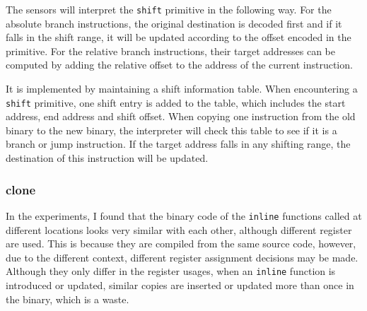 The sensors will interpret the {\tt shift} primitive in the following way. 
For the absolute branch instructions, the original destination is decoded
first and if it falls in the shift range, it will be updated according
to the offset encoded in the primitive.
For the relative branch instructions, their target addresses can be computed by adding the relative offset to the 
address of the current instruction.

It is implemented by maintaining a shift information table. When encountering a {\tt shift} primitive,
one shift entry is added to the table, which includes the start address, end address and shift offset.
When copying one instruction from the old binary to the new binary, the interpreter will check this table to see if it 
is a branch or jump instruction. If the target address falls in any shifting range, the destination of this instruction 
will be updated.
%        

\subsubsection {clone}
In the experiments, I found that the binary code of the {\tt inline} functions called at different locations looks very 
similar with each other, although different register are used. This is because they are compiled from the same source 
code, however, due to the different context, different register assignment decisions may be made. Although they only 
differ in the register usages, when an {\tt inline} function is introduced or updated, similar copies are inserted or 
updated more than once in the binary, which is a waste.

